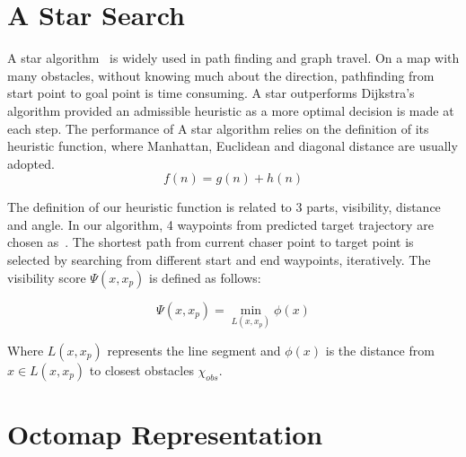 \section{A Star Search}
A star algorithm~\cite{AStar1972} is widely used in path finding and graph travel. On a map with many obstacles, without knowing much about the direction, pathfinding from start point to goal point is time consuming. A star outperforms Dijkstra's algorithm provided an admissible heuristic as a more optimal decision is made at each step. The performance of A star algorithm relies on the definition of its heuristic function, where Manhattan, Euclidean and diagonal distance are usually adopted.
\begin{equation}\label{eq:a_star}
f(n)=g(n)+h(n)
\end{equation}

The definition of our heuristic function is related to 3 parts, visibility, distance and angle. In our algorithm, 4 waypoints from predicted target trajectory are chosen as~\cite{Jeon2019}. The shortest path from current chaser point to target point is selected by searching from different start and end waypoints, iteratively. The visibility score $\Psi(x,x_p)$ is defined as follows:

\begin{equation}\label{eq:2}
\Psi(x,x_p)=\min\limits_{L(x,x_p)}\phi(x)
\end{equation}

Where $L(x,x_p)$ represents the line segment and $\phi(x)$ is the distance from $x\in L(x,x_p)$ to closest obstacles $\chi_{obs}$.


\section{Octomap Representation}
